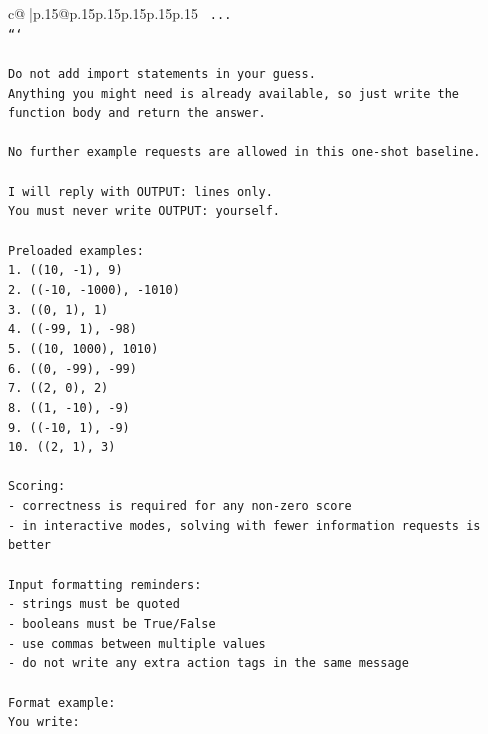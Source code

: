 \documentclass{article}
\begin{document}
{\begin{supertabular}{c@{$\;$}|p{.15\linewidth}@{}p{.15\linewidth}p{.15\linewidth}p{.15\linewidth}p{.15\linewidth}p{.15\linewidth}}
{{{\texttt{    ...} \\
\texttt{```} \\
\\ 
\texttt{Do not add import statements in your guess.} \\
\texttt{Anything you might need is already available, so just write the function body and return the answer.} \\
\\ 
\texttt{No further example requests are allowed in this one{-}shot baseline.} \\
\\ 
\texttt{I will reply with OUTPUT: lines only.} \\
\texttt{You must never write OUTPUT: yourself.} \\
\\ 
\texttt{Preloaded examples:} \\
\texttt{1. ((10, {-}1), 9)} \\
\texttt{2. (({-}10, {-}1000), {-}1010)} \\
\texttt{3. ((0, 1), 1)} \\
\texttt{4. (({-}99, 1), {-}98)} \\
\texttt{5. ((10, 1000), 1010)} \\
\texttt{6. ((0, {-}99), {-}99)} \\
\texttt{7. ((2, 0), 2)} \\
\texttt{8. ((1, {-}10), {-}9)} \\
\texttt{9. (({-}10, 1), {-}9)} \\
\texttt{10. ((2, 1), 3)} \\
\\ 
\texttt{Scoring:} \\
\texttt{{-} correctness is required for any non{-}zero score} \\
\texttt{{-} in interactive modes, solving with fewer information requests is better} \\
\\ 
\texttt{Input formatting reminders:} \\
\texttt{{-} strings must be quoted} \\
\texttt{{-} booleans must be True/False} \\
\texttt{{-} use commas between multiple values} \\
\texttt{{-} do not write any extra action tags in the same message} \\
\\ 
\texttt{Format example:} \\
\texttt{You write:} \\
}}}
\end{supertabular}}
\end{document}
